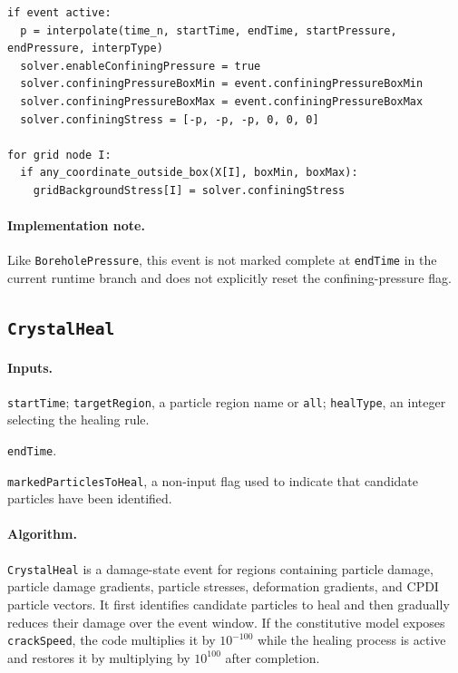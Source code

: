 \begin{lstlisting}[caption={ConfiningPressure event pseudocode.}]
if event active:
  p = interpolate(time_n, startTime, endTime, startPressure, endPressure, interpType)
  solver.enableConfiningPressure = true
  solver.confiningPressureBoxMin = event.confiningPressureBoxMin
  solver.confiningPressureBoxMax = event.confiningPressureBoxMax
  solver.confiningStress = [-p, -p, -p, 0, 0, 0]

for grid node I:
  if any_coordinate_outside_box(X[I], boxMin, boxMax):
    gridBackgroundStress[I] = solver.confiningStress
\end{lstlisting}

\paragraph{Implementation note.}
Like \texttt{BoreholePressure}, this event is not marked complete at \texttt{endTime} in the current runtime branch and does not explicitly reset the confining-pressure flag.

\subsection{\texttt{CrystalHeal}}
\label{subsec:event-crystal-heal}

\paragraph{Inputs.}
\begin{description}[leftmargin=*,style=nextline]
\item[\textbf{Required.}] \texttt{startTime}; \texttt{targetRegion}, a particle region name or \texttt{all}; \texttt{healType}, an integer selecting the healing rule.
\item[\textbf{Optional.}] \texttt{endTime}.
\item[\textbf{Internal state.}] \texttt{markedParticlesToHeal}, a non-input flag used to indicate that candidate particles have been identified.
\end{description}

\paragraph{Algorithm.}
\texttt{CrystalHeal} is a damage-state event for regions containing particle damage, particle damage gradients, particle stresses, deformation gradients, and CPDI particle vectors.  It first identifies candidate particles to heal and then gradually reduces their damage over the event window.  If the constitutive model exposes \texttt{crackSpeed}, the code multiplies it by $10^{-100}$ while the healing process is active and restores it by multiplying by $10^{100}$ after completion.

